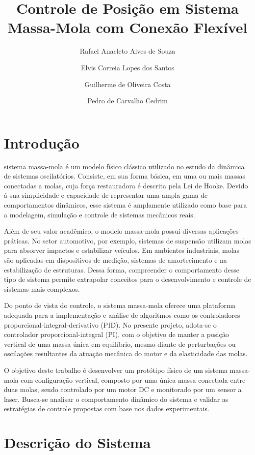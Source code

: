 \documentclass[9pt,a4paper,twocolumn,twoside]{tau-class/tau}
\title{Controle de Posição em Sistema Massa-Mola com Conexão Flexível}
\author[a,1]{Rafael Anacleto Alves de Souza}
\author[a,2]{Elvis Correia Lopes dos Santos}
\author[a,3]{Guilherme de Oliveira Costa}
\author[a,4]{Pedro de Carvalho Cedrim}
\affil[a]{Instituto de Computação, Universidade Federal de Alagoas – Campus A.C. Simões\\
\textsuperscript{1}\texttt{raas@ic.ufal.br}, 
\textsuperscript{2}\texttt{ecls@ic.ufal.br}, 
\textsuperscript{3}\texttt{goc@ic.ufal.br},
\textsuperscript{4}\texttt{pcc@ic.ufal.br}}
\begin{document}
		
    \maketitle 
    \thispagestyle{firststyle} 
    \tauabstract
    

\section{Introdução}

    sistema massa-mola é um modelo físico clássico utilizado no estudo da dinâmica de sistemas oscilatórios. Consiste, em sua forma básica, em uma ou mais massas conectadas a molas, cuja força restauradora é descrita pela Lei de Hooke. Devido à sua simplicidade e capacidade de representar uma ampla gama de comportamentos dinâmicos, esse sistema é amplamente utilizado como base para a modelagem, simulação e controle de sistemas mecânicos reais.

    Além de seu valor acadêmico, o modelo massa-mola possui diversas aplicações práticas. No setor automotivo, por exemplo, sistemas de suspensão utilizam molas para absorver impactos e estabilizar veículos. Em ambientes industriais, molas são aplicadas em dispositivos de medição, sistemas de amortecimento e na estabilização de estruturas. Dessa forma, compreender o comportamento desse tipo de sistema permite extrapolar conceitos para o desenvolvimento e controle de sistemas mais complexos.

    Do ponto de vista do controle, o sistema massa-mola oferece uma plataforma adequada para a implementação e análise de algoritmos como os controladores proporcional-integral-derivativo (PID). No presente projeto, adota-se o controlador proporcional-integral (PI), com o objetivo de manter a posição vertical de uma massa única em equilíbrio, mesmo diante de perturbações ou oscilações resultantes da atuação mecânica do motor e da elasticidade das molas.

    O objetivo deste trabalho é desenvolver um protótipo físico de um sistema massa-mola com configuração vertical, composto por uma única massa conectada entre duas molas, sendo controlado por um motor DC e monitorado por um sensor a laser. Busca-se analisar o comportamento dinâmico do sistema e validar as estratégias de controle propostas com base nos dados experimentais.

\section{Descrição do Sistema}
\end{document}
